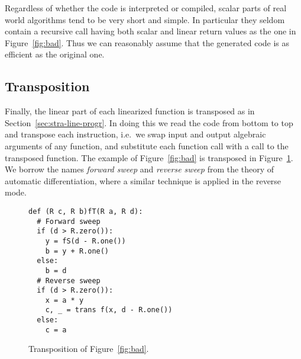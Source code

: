 \begin{remark}
  Regardless of whether the code is interpreted or compiled, scalar
  parts of real world algorithms tend to be very short and simple. In
  particular they seldom contain a recursive call having both scalar
  and linear return values as the one in Figure~\ref{fig:bad}. Thus we
  can reasonably assume that the generated code is as efficient as the
  original one.
\end{remark}


\subsection{Transposition}
\label{sec:transposition}
Finally, the linear part of each linearized function is transposed as
in Section~\ref{sec:stra-line-progr}. In doing this we read the code
from bottom to top and transpose each instruction, i.e.\ we swap input
and output algebraic arguments of any function, and substitute each
function call with a call to the transposed function. The example of
Figure~\ref{fig:bad} is transposed in Figure~\ref{fig:mechant}. We
borrow the names \emph{forward sweep} and
\emph{reverse sweep} from the theory of automatic
differentiation, where a similar technique is applied in the reverse
mode.

\begin{figure}[hb]
  \centering
\begin{lstlisting}[frame=single,frameround=tttt]
def (R c, R b)fT(R a, R d):
  # Forward sweep
  if (d > R.zero()):
    y = fS(d - R.one())
    b = y + R.one()
  else:
    b = d
  # Reverse sweep
  if (d > R.zero()):
    x = a * y
    c, _ = trans f(x, d - R.one())
  else:
    c = a
\end{lstlisting}
  \caption{Transposition of Figure~\ref{fig:bad}.}
  \label{fig:mechant}
\end{figure}





